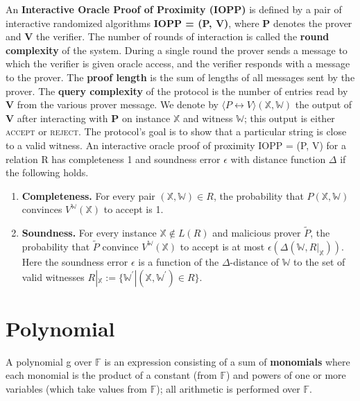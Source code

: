 \begin{definition}
An \textbf{Interactive Oracle Proof of Proximity (IOPP)} is defined by a pair of interactive randomized
algorithms \textbf{IOPP = (P, V)}, where \textbf{P} denotes the prover and \textbf{V} the verifier. 
The number of rounds of interaction is called the \textbf{round complexity} of the system. 
During a single round the prover sends a message to which the verifier is given oracle access, and the verifier responds with a message to the prover. 
The \textbf{proof length} is the sum of lengths of all messages sent by the prover. 
The \textbf{query complexity} of the protocol is the number of entries read by \textbf{V} from the various prover message.
We denote by $\langle P \leftrightarrow V \rangle (\mathbb{X}, \mathbb{W})$ the output of \textbf{V} after interacting with \textbf{P} on instance $\mathbb{X}$ and witness $\mathbb{W}$; this output is either \textsc{accept} or \textsc{reject}.
The protocol's goal is to show that a particular string is close to a valid witness.
An interactive oracle proof of proximity IOPP = (P, V) for a relation R has completeness 1 and soundness error $\epsilon$ with distance function $\Delta$ if the following holds.

\begin{enumerate}
    \item \textbf{Completeness.}
    For every pair $(\mathbb{X}, \mathbb{W}) \in R$, the probability that $P(\mathbb{X}, \mathbb{W})$ convinces $V^{\mathbb{W}}(\mathbb{X})$ to accept is 1.
    
    \item \textbf{Soundness.}
    For every instance $\mathbb{X} \not\in L(R)$ and malicious prover $\tilde{P}$, the probability that $\tilde{P}$ convince $V^{\mathbb{W}}(\mathbb{X})$ to accept is at most $\epsilon(\Delta(\mathbb{W}, R|_{\mathbb{X}}))$. Here the soundness error $\epsilon$ is a function of the $\Delta$-distance of $\mathbb{W}$ to the set of valid witnesses $R|_{\mathbb{X}} := \{ \mathbb{W}^\prime | (\mathbb{X}, \mathbb{W}^\prime) \in R \}$.
\end{enumerate}
\end{definition}

\section{Polynomial}

\begin{definition}
A polynomial g over $\mathbb{F}$ is an expression consisting of a sum of \textbf{monomials} where each monomial is the product of a constant (from $\mathbb{F}$) and powers of one or more variables (which take values from $\mathbb{F}$); all arithmetic is performed over $\mathbb{F}$.
\end{definition}

